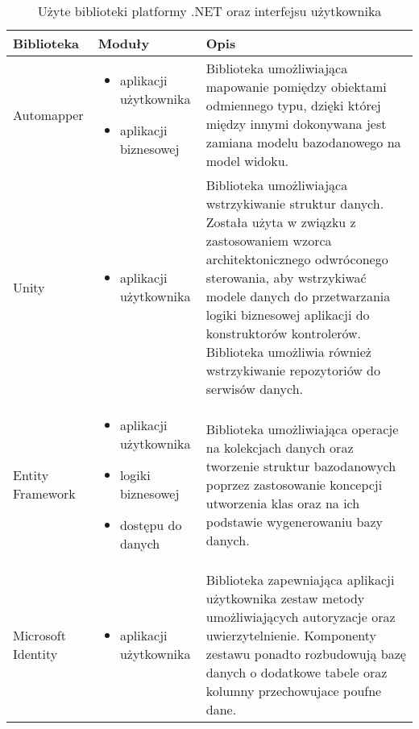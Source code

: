 \begin{center}
    \begin{longtable}{ | p{2.2cm} | p{5cm} | p{6.5cm} |}
   	\caption{Użyte biblioteki platformy .NET oraz interfejsu użytkownika} \\
    \hline Biblioteka & Moduły & Opis \\ \hline    
    \hline Automapper &  
    	\begin{itemize} 
   			 \item aplikacji użytkownika
   			 \item aplikacji biznesowej	
   		\end{itemize} 
    & Biblioteka umożliwiająca mapowanie pomiędzy obiektami odmiennego typu, dzięki której między innymi dokonywana jest zamiana modelu bazodanowego na model widoku.\\ \hline
    
    \hline Unity &	
    \begin{itemize} 
   			 \item aplikacji użytkownika
    \end{itemize}
   			 & Biblioteka umożliwiająca wstrzykiwanie struktur danych. Została użyta w związku z zastosowaniem wzorca architektonicznego odwróconego sterowania, aby wstrzykiwać modele danych do przetwarzania logiki biznesowej aplikacji do konstruktorów kontrolerów. Biblioteka umożliwia również wstrzykiwanie repozytoriów do serwisów danych.	\\ \hline
    
        \hline Entity \mbox{Framework} &  
    	\begin{itemize} 
   			  \item aplikacji użytkownika
 			  \item logiki biznesowej
			  \item dostępu do danych
   		\end{itemize} 
    &  Biblioteka umożliwiająca operacje na kolekcjach danych oraz tworzenie struktur bazodanowych poprzez zastosowanie koncepcji utworzenia klas oraz na ich podstawie wygenerowaniu bazy danych.\\ \hline
    
        \hline Microsoft Identity & 
         \begin{itemize} 
   			 \item aplikacji użytkownika
    	\end{itemize} & Biblioteka zapewniająca aplikacji użytkownika zestaw metody umożliwiających autoryzacje oraz uwierzytelnienie. Komponenty zestawu ponadto rozbudowują bazę danych o dodatkowe tabele oraz kolumny przechowujace poufne dane. \\ \hline
    

\end{longtable}
\end{center}
